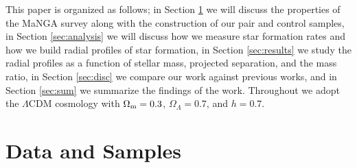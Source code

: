 \documentclass[iop,revtex4,twocolumn,apj,numberedappendix,appendixfloats]{emulateapj}
\begin{document}
This paper is organized as follows; in Section \ref{sec:data} we will discuss the properties of the MaNGA survey along with the construction of our pair and control samples, in Section \ref{sec:analysis} we will discuss how we measure star formation rates and how we build radial profiles of star formation, in Section \ref{sec:results} we study the radial profiles as a function of stellar mass, projected separation, and the mass ratio, in Section \ref{sec:disc} we compare our work against previous works, and in Section \ref{sec:sum} we summarize the findings of the work. 
Throughout we adopt the $\Lambda$CDM cosmology with $\Omega_{\rm m}=0.3$, $\Omega_\Lambda=0.7$, and $h=0.7$. 

\section{Data and Samples}\label{sec:data}
\end{document}
